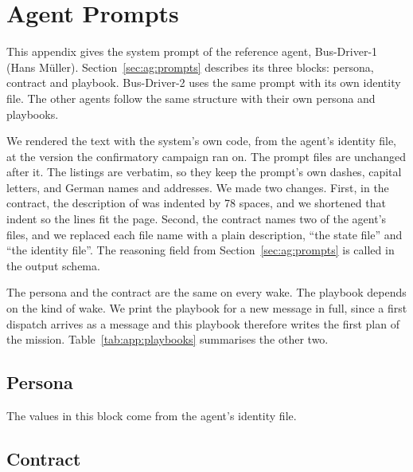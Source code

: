 \chapter{Agent Prompts}
\label{app:prompts}


This appendix gives the system prompt of the reference agent, Bus-Driver-1
(Hans Müller). Section~\ref{sec:ag:prompts} describes its three blocks:
persona, contract and playbook. Bus-Driver-2 uses the same prompt with its own
identity file. The other agents follow the same structure with their own
persona and playbooks.

We rendered the text with the system's own code, from the agent's identity
file, at the version the confirmatory campaign ran on. The prompt files are
unchanged after it. The listings are verbatim, so they
keep the prompt's own dashes, capital letters, and German names and addresses.
We made two changes. First, in the contract, the description of
 was indented by 78 spaces, and we shortened that indent so
the lines fit the page. Second, the contract names two of the agent's files,
and we replaced each file name with a plain description, ``the state file''
and ``the identity file''.
The reasoning field from Section~\ref{sec:ag:prompts} is called
 in the output schema.

The persona and the contract are the same on every wake. The playbook depends
on the kind of wake. We print the playbook for a new message in full, since a
first dispatch arrives as a message and this playbook therefore writes the
first plan of the mission. Table~\ref{tab:app:playbooks} summarises the other
two.

\section{Persona}
\label{app:prompts:persona}

The values in this block come from the agent's identity file.



\section{Contract}
\label{app:prompts:contract}

